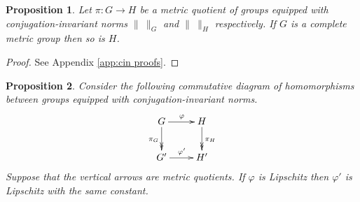 \documentclass[12pt]{amsart}
\newtheorem{prop}{Proposition}[section]
\theoremstyle{definition}
\begin{document}
\begin{prop}\label{P:quotient complete}
Let $\pi \colon G \to H$ be a metric quotient of groups equipped with conjugation-invariant norms $\| \ \|_G$ and $\| \ \|_H$ respectively.
If $G$ is a complete metric group then so is $H$.
\end{prop}

\begin{proof}
See Appendix \ref{app:cin proofs}.
\end{proof}

\begin{prop}\label{P:quotient Lipschitz maps}
Consider the following commutative diagram of homomorphisms between groups equipped with conjugation-invariant norms.
\[
\xymatrix{
G \ar[r]^\varphi \ar@{->>}[d]_{\pi_G} &
H \ar@{->>}[d]^{\pi_H}
\\
G' \ar[r]^{\varphi'} & 
H'
}
\]
Suppose that the vertical arrows are metric quotients. 
If $\varphi$ is Lipschitz then $\varphi'$ is Lipschitz with the same constant.
\end{prop}
\end{document}
